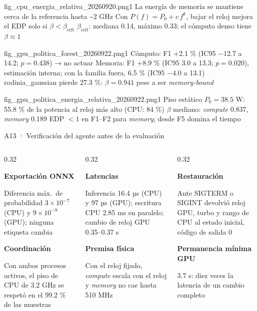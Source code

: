   {fig_cpu_energia_relativa_20260920.png}{1}
  {La energía de memoria se mantiene cerca de la referencia hasta \textasciitilde 2 GHz}
  {Con $P(f)=P_0+c\,f^k$, bajar el reloj mejora el EDP solo si $\beta<\beta_{\text{crít}}$}
  {$\beta_{\text{crít}}$: mediana 0.14, máximo 0.33; el cómputo denso tiene $\beta\approx1$}

  {fig_gpu_politica_forest_20260922.png}{1}
  {Cómputo: F1 +2.1 \% (IC95 $-12.7$ a 14.2; $p=0.438$) → no actuar}
  {Memoria: F1 +8.9 \% (IC95 3.0 a 13.3; $p=0.020$), estimación interna; con la familia fuera, 6.5 \% (IC95 $-4.0$ a 13.1)}
  {rodinia\_gaussian pierde 27.3 \%: $\beta=0.941$ pese a ser \textit{memory-bound}}

  {fig_gpu_politica_energia_relativa_20260922.png}{1}
  {Piso estático $P_0=38.5$ W: 55.8 \% de la potencia al reloj más alto (CPU: 84 \%)}
  {$\beta$ mediano: \textit{compute} 0.837, \textit{memory} 0.189}
  {EDP $<1$ en F1--F2 para \textit{memory}; desde F5 domina el tiempo}

\newcommand{\vcard}[2]{\begin{card}[height=21mm,valign=top]{\footnotesize\bfseries #1}\par\vspace{0.6mm}#2\end{card}}

\begin{frame}{A13 · Verificación del agente antes de la evaluación}
  \vspace{2mm}
  \begin{columns}[T]
    \begin{column}{0.32\textwidth}
      \vcard{Exportación ONNX}{Diferencia máx.\ de probabilidad $3\times10^{-7}$ (CPU) y $9\times10^{-8}$ (GPU); ninguna etiqueta cambia}
      \vcard{Coordinación}{Con ambos procesos activos, el piso de CPU de 3.2 GHz se respetó en el 99.2 \% de las muestras}
    \end{column}
    \begin{column}{0.32\textwidth}
      \vcard{Latencias}{Inferencia 16.4 µs (CPU) y 97 µs (GPU); escritura CPU 2.85 ms en paralelo; cambio de reloj GPU 0.35--0.37 s}
      \vcard{Premisa física}{Con el reloj fijado, \textit{compute} escala con el reloj y \textit{memory} no cae hasta 510 MHz}
    \end{column}
    \begin{column}{0.32\textwidth}
      \vcard{Restauración}{Ante SIGTERM o SIGINT devolvió reloj GPU, turbo y rango de CPU al estado inicial, código de salida 0}
      \vcard{Permanencia mínima GPU}{3.7 s: diez veces la latencia de un cambio completo}
    \end{column}
  \end{columns}
\end{frame}


